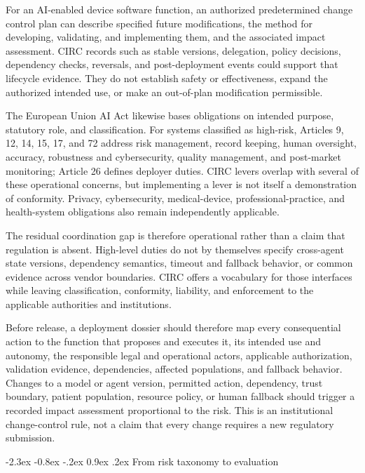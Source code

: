 \documentclass[10pt]{article}
\makeatletter
\renewcommand\section{\@startsection{section}{1}{\z@}%
  {-2.3ex \@plus -0.8ex \@minus -.2ex}%
  {0.9ex \@plus .2ex}%
  {\normalfont\sffamily\bfseries\normalsize}}
\makeatother
\begin{document}
For an AI-enabled device software function, an authorized predetermined change control plan can
describe specified future modifications, the method for developing, validating, and implementing
them, and the associated impact assessment.\cite{fda2025pccp} CIRC records such as stable versions,
delegation, policy decisions, dependency checks, reversals, and post-deployment events could support
that lifecycle evidence. They do not establish safety or effectiveness, expand the authorized
intended use, or make an out-of-plan modification permissible.

The European Union AI Act likewise bases obligations on intended purpose, statutory role, and
classification. For systems classified as high-risk, Articles 9, 12, 14, 15, 17, and 72 address risk
management, record keeping, human oversight, accuracy, robustness and cybersecurity, quality
management, and post-market monitoring; Article 26 defines deployer duties.\cite{eu2024aiact} CIRC
levers overlap with several of these operational concerns, but implementing a lever is not itself a
demonstration of conformity. Privacy, cybersecurity, medical-device, professional-practice, and
health-system obligations also remain independently applicable.

The residual coordination gap is therefore operational rather than a claim that regulation is absent.
High-level duties do not by themselves specify cross-agent state versions, dependency semantics,
timeout and fallback behavior, or common evidence across vendor boundaries. CIRC offers a vocabulary
for those interfaces while leaving classification, conformity, liability, and enforcement to the
applicable authorities and institutions.

Before release, a deployment dossier should therefore map every consequential action to the function
that proposes and executes it, its intended use and autonomy, the responsible legal and operational
actors, applicable authorization, validation evidence, dependencies, affected populations, and
fallback behavior. Changes to a model or agent version, permitted action, dependency, trust boundary,
patient population, resource policy, or human fallback should trigger a recorded impact assessment
proportional to the risk. This is an institutional change-control rule, not a claim that every change
requires a new regulatory submission.

\section{From risk taxonomy to evaluation}
\end{document}
